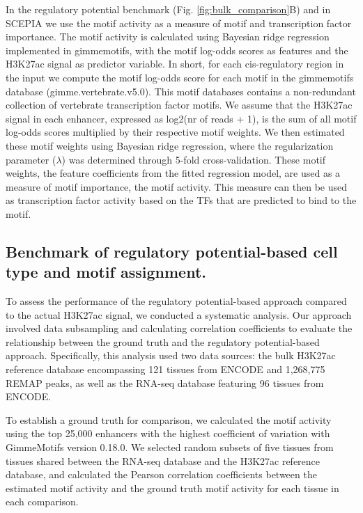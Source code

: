In the regulatory potential benchmark (Fig. \ref{fig:bulk_comparison}B) and in SCEPIA we use the motif activity as a measure of motif and transcription factor importance. The motif activity\cite{FANTOM2009, Balwierz2014} is calculated using Bayesian ridge regression implemented in gimmemotifs\cite{Bruse_2018}, with the motif log-odds scores as features and the H3K27ac signal as predictor variable. In short, for each cis-regulatory region in the input we compute the motif log-odds score for each motif in the gimmemotifs database (gimme.vertebrate.v5.0). This motif databases contains a non-redundant collection of vertebrate transcription factor motifs\cite{Bruse_2018}. We assume that the H3K27ac signal in each enhancer, expressed as log2(nr of reads + 1), is the sum of all motif log-odds scores multiplied by their respective motif weights. We then estimated these motif weights using Bayesian ridge regression, where the regularization parameter ($\lambda$) was determined through 5-fold cross-validation. These motif weights, the feature coefficients from the fitted regression model, are used as a measure of motif importance, the motif activity. This measure can then be used as transcription factor activity based on the TFs that are predicted to bind to the motif.

\subsection{Benchmark of regulatory potential-based cell type and motif assignment.}

To assess the performance of the regulatory potential-based approach compared to the actual H3K27ac signal, we conducted a systematic analysis. Our approach involved data subsampling and calculating correlation coefficients to evaluate the relationship between the ground truth and the regulatory potential-based approach. Specifically, this analysis used two data sources: the bulk H3K27ac reference database encompassing 121 tissues from ENCODE and 1,268,775 REMAP peaks, as well as the RNA-seq database featuring 96 tissues from ENCODE.

To establish a ground truth for comparison, we calculated the motif activity using the top 25,000 enhancers with the highest coefficient of variation with GimmeMotifs version 0.18.0\cite{Bruse_2018}. We selected random subsets of five tissues from tissues shared between the RNA-seq database and the H3K27ac reference database, and calculated the Pearson correlation coefficients between the estimated motif activity and the ground truth motif activity for each tissue in each comparison.

